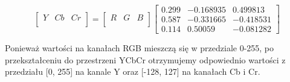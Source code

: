 \[
\begin{bmatrix}
    Y & Cb & Cr \\
\end{bmatrix}
=
\begin{bmatrix}
    R & G & B \\
\end{bmatrix}
\begin{bmatrix}
    0.299 & -0.168935 & 0.499813 \\
    0.587 & -0.331665 & -0.418531 \\
    0.114 & 0.50059 & -0.081282 
\end{bmatrix}
\]


Ponieważ wartości na kanałach RGB mieszczą się w przedziale 0-255, po przekształceniu do przestrzeni YCbCr otrzymujemy odpowiednio wartości z przedziału [0, 255] na kanale Y oraz [-128, 127] na kanałach Cb i Cr.